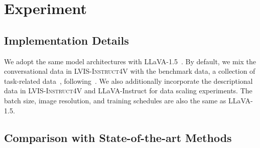 \documentclass{article}
\newcommand{\dataname}{\textsc{LVIS-Instruct4V}\xspace}
\begin{document}
 \section{Experiment}
\label{sec:exp}
\subsection{Implementation Details}
We adopt the same model architectures with LLaVA-1.5~\cite{liu2023improved}. By default, we mix the conversational data in \dataname with the benchmark data, a collection of task-related data~\cite{goyal2017vqav2,okvqa,hudson2019gqa,mishra2019ocrvqa,schwenk2022okvqa,singh2019textvqa,kazemzadeh2014referitgame,krishna2017visual,sharegpt}, following~\cite{liu2023improved}.  We also additionally incorporate the descriptional data in \dataname and LLaVA-Instruct for data scaling experiments. The batch size, image resolution, and training schedules are also the same as LLaVA-1.5. 

\subsection{Comparison with State-of-the-art Methods}
\end{document}
